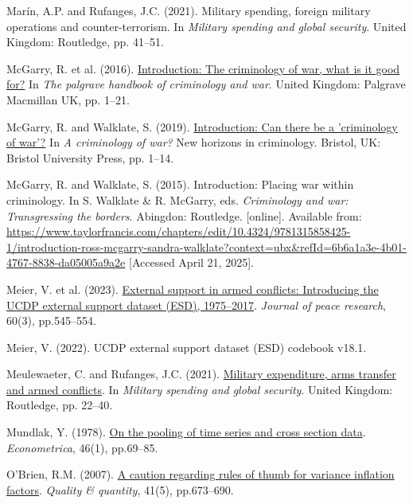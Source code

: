 \documentclass[
]{article}
\newlength{\cslhangindent}
\newenvironment{CSLReferences}[2] %
 {\begin{list}{}{%
  \setlength{\itemindent}{0pt}
  \setlength{\leftmargin}{0pt}
  \setlength{\parsep}{0pt}
  \ifodd #1
   \setlength{\leftmargin}{\cslhangindent}
   \setlength{\itemindent}{-1\cslhangindent}
  \fi
  \setlength{\itemsep}{#2\baselineskip}}}
 {\end{list}}
\begin{document}
\begin{CSLReferences}{0}{1}
Marín, A.P. and Rufanges, J.C. (2021). Military spending, foreign
military operations and counter-terrorism. In \emph{Military spending
and global security}. United Kingdom: Routledge, pp. 41--51.

McGarry, R. et al. (2016).
\href{https://doi.org/10.1057/978-1-137-43170-7_1}{Introduction: The
criminology of war, what is it good for?} In \emph{The palgrave handbook
of criminology and war}. United Kingdom: Palgrave Macmillan UK, pp.
1--21.

McGarry, R. and Walklate, S. (2019).
\href{https://doi.org/10.51952/9781529202618.ch001}{Introduction: Can
there be a 'criminology of war'?} In \emph{A criminology of war?} New
horizons in criminology. Bristol, UK: Bristol University Press, pp.
1--14.

McGarry, R. and Walklate, S. (2015). Introduction: Placing war within
criminology. In S. Walklate \& R. McGarry, eds. \emph{Criminology and
war: Transgressing the borders}. Abingdon: Routledge. {[}online{]}.
Available from:
\url{https://www.taylorfrancis.com/chapters/edit/10.4324/9781315858425-1/introduction-ross-mcgarry-sandra-walklate?context=ubx&refId=6b6a1a3e-4b01-4767-8838-da05005a9a2e}
{[}Accessed April 21, 2025{]}.

Meier, V. et al. (2023).
\href{https://doi.org/10.1177/00223433221079864}{External support in
armed conflicts: Introducing the UCDP external support dataset (ESD),
1975--2017}. \emph{Journal of peace research}, 60(3), pp.545--554.

Meier, V. (2022). UCDP external support dataset (ESD) codebook v18.1.

Meulewaeter, C. and Rufanges, J.C. (2021).
\href{https://doi.org/10.4324/9781003045823-3}{Military expenditure,
arms transfer and armed conflicts}. In \emph{Military spending and
global security}. United Kingdom: Routledge, pp. 22--40.

Mundlak, Y. (1978). \href{https://doi.org/10.2307/1913646}{On the
pooling of time series and cross section data}. \emph{Econometrica},
46(1), pp.69--85.

O'Brien, R.M. (2007). \href{https://doi.org/10.1007/s11135-006-9018-6}{A
caution regarding rules of thumb for variance inflation factors}.
\emph{Quality \& quantity}, 41(5), pp.673--690.


\end{CSLReferences}
\end{document}
